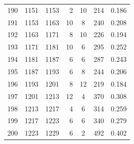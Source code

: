 \documentclass[12pt]{article}
\theoremstyle{plain}
\theoremstyle{definition}
\theoremstyle{remark}
\begin{document}
\begin{center}
\begin{small}
\begin{longtable}{@{}crrrccc@{}}
190 & 1151 & 1153 & 2 & 10 & 214 & 0.186 \\
191 & 1153 & 1163 & 10 & 8 & 240 & 0.208 \\
192 & 1163 & 1171 & 8 & 10 & 226 & 0.194 \\
193 & 1171 & 1181 & 10 & 6 & 295 & 0.252 \\
194 & 1181 & 1187 & 6 & 6 & 287 & 0.243 \\
195 & 1187 & 1193 & 6 & 8 & 244 & 0.206 \\
196 & 1193 & 1201 & 8 & 12 & 219 & 0.184 \\
197 & 1201 & 1213 & 12 & 4 & 370 & 0.308 \\
198 & 1213 & 1217 & 4 & 6 & 314 & 0.259 \\
199 & 1217 & 1223 & 6 & 6 & 340 & 0.279 \\
200 & 1223 & 1229 & 6 & 2 & 492 & 0.402 \\
\end{longtable}
\end{small}
\end{center}
\end{document}

